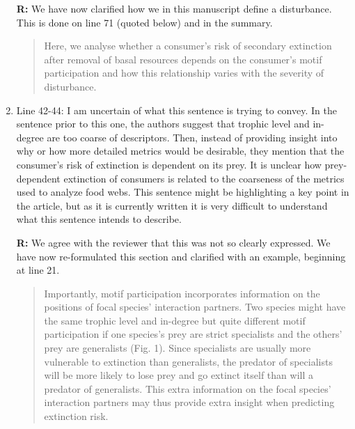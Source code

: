 \documentclass[12pt]{article}
\begin{document}
\begin{enumerate}
             \textbf{R:}
             We have now clarified how we in this manuscript define a disturbance. This is done on line 71 (quoted below) and in the summary. 
             
             \begin{quotation}
             Here, we analyse whether a consumer's risk of secondary extinction after removal of basal resources depends on the consumer's motif participation and how this relationship varies with the severity of disturbance.
            \end{quotation}

            \item Line 42-44: I am uncertain of what this sentence is trying to convey. In the sentence prior to this one, the authors suggest that trophic level and in-degree are too coarse of descriptors. Then, instead of providing insight into why or how more detailed metrics would be desirable, they mention that the consumer's risk of extinction is dependent on its prey. It is unclear how prey-dependent extinction of consumers is related to the coarseness of the metrics used to analyze food webs. This sentence might be highlighting a key point in the article, but as it is currently written it is very difficult to understand what this sentence intends to describe.

                \textbf{R:} We agree with the reviewer that this was not so clearly expressed. We have now re-formulated this section and clarified with an example, beginning at line 21. 
                
                \begin{quotation}
                    Importantly, motif participation incorporates information on the positions of focal species' interaction partners.
                    Two species might have the same trophic level and in-degree but quite different motif participation if one species's prey are strict specialists and the others' prey are generalists (Fig. 1).
                    Since specialists are usually more vulnerable to extinction than generalists, the predator of specialists will be more likely to lose prey and go extinct itself than will a predator of generalists.
                    This extra information on the focal species' interaction partners may thus provide extra insight when predicting extinction risk.
                \end{quotation}


\end{enumerate}
\end{document}

